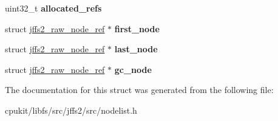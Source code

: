\begin{DoxyCompactItemize}
uint32\+\_\+t {\bfseries allocated\+\_\+refs}
\item 
\mbox{\label{structjffs2__eraseblock_a64ee299e8644e7dd1e98282a4259d8b6}} 
struct \mbox{\hyperlink{structjffs2__raw__node__ref}{jffs2\+\_\+raw\+\_\+node\+\_\+ref}} $\ast$ {\bfseries first\+\_\+node}
\item 
\mbox{\label{structjffs2__eraseblock_ae627fec4eb586ce41122747951cc49e6}} 
struct \mbox{\hyperlink{structjffs2__raw__node__ref}{jffs2\+\_\+raw\+\_\+node\+\_\+ref}} $\ast$ {\bfseries last\+\_\+node}
\item 
\mbox{\label{structjffs2__eraseblock_a707679bade598e68f10d8bf1b60888d3}} 
struct \mbox{\hyperlink{structjffs2__raw__node__ref}{jffs2\+\_\+raw\+\_\+node\+\_\+ref}} $\ast$ {\bfseries gc\+\_\+node}
\end{DoxyCompactItemize}


The documentation for this struct was generated from the following file\+:\begin{DoxyCompactItemize}
\item 
cpukit/libfs/src/jffs2/src/nodelist.\+h\end{DoxyCompactItemize}
